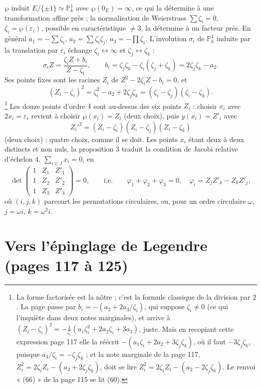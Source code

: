 \documentclass[11pt,a4paper]{article}
\begin{document}
$\wp$ induit $E/\{\pm 1\} \simeq \mathbb{P}^1_k$ avec $\wp(0_E) = \infty$, ce qui
la détermine à une transformation affine près ; la normalisation de Weierstrass
$\sum \zeta_i = 0$, $\zeta_i = \wp(\varepsilon_i)$, possible en caractéristique
$\neq 3$, la détermine à un facteur près. En général $a_1 = -\sum \zeta_i$, $a_2
= \sum \zeta_i \zeta_j$, $a_3 = -\prod \zeta_i$. L'involution $\sigma_i$ de
$\mathbb{P}^1_k$ induite par la translation par $\varepsilon_i$ échange $\zeta_i
\leftrightarrow \infty$ et $\zeta_j \leftrightarrow \zeta_k$ :
\[
\sigma_i Z = \frac{\zeta_i Z + b_i}{Z - \zeta_i}, \qquad b_i = \zeta_j\zeta_k -
\zeta_i(\zeta_j + \zeta_k) = 2\zeta_j\zeta_k - a_2 .
\]
Ses points fixes sont les racines $Z_i$ de $Z^2 - 2\zeta_i Z - b_i = 0$, et
\[
(Z_i - \zeta_i)^2 = \zeta_i^2 - a_2 + 2\zeta_j\zeta_k = (\zeta_i - \zeta_j)(\zeta_i
- \zeta_k) .
\]
\footnote{La forme factorisée est la nôtre ; c'est la formule classique de la
division par $2$. La page passe par $b_i = -(a_2 + 2a_3/\zeta_i)$, qui suppose
$\zeta_i \neq 0$ (ce qui l'inquiète dans deux notes marginales), et arrive à
$(Z_i - \zeta_i)^2 = -\frac{1}{\zeta_i}(a_1\zeta_i^2 + 2a_2\zeta_i + 3a_3)$,
juste. Mais en recopiant cette expression page 117 elle la réécrit $-(a_1\zeta_i
+ 2a_2 + 3\zeta_j\zeta_k)$, où il faut $-3\zeta_j\zeta_k$, puisque $a_3/\zeta_i =
-\zeta_j\zeta_k$ ; et la note marginale de la page 117, $Z_i^2 = 2\zeta_i Z_i -
(a_2 + 2\zeta_j\zeta_k)$, doit se lire $Z_i^2 = 2\zeta_i Z_i - (a_2 -
2\zeta_j\zeta_k)$. Le renvoi « (66) » de la page 115 se lit (60).} Les douze
points d'ordre $4$ sont au-dessus des six points $Z_i$ : choisir $x_i$ avec $2x_i
= \varepsilon_i$ revient à choisir $\wp(x_i) = Z_i$ (deux choix), puis $y(x_i) =
Z'_i$ avec
\[
Z_i'^2 = (Z_i - \zeta_i)(Z_i - \zeta_j)(Z_i - \zeta_k)
\]
(deux choix) : quatre choix, comme il se doit. Les points $x_i$ étant deux à
deux distincts et non nuls, la proposition 3 traduit la condition de Jacobi
relative d'échelon $4$, $\sum_{i \in J} x_i = 0$, en
\[
\det \begin{pmatrix} 1 & Z_1 & Z'_1 \\ 1 & Z_2 & Z'_2 \\ 1 & Z_3 & Z'_3
\end{pmatrix} = 0, \qquad \text{i.e.} \qquad \varphi_1 + \varphi_2 + \varphi_3 =
0, \quad \varphi_i = Z_j Z'_k - Z_k Z'_j,
\]
où $(i, j, k)$ parcourt les permutations circulaires, ou, pour un ordre
circulaire $\omega$, $j = \omega i$, $k = \omega^2 i$.

\section*{Vers l'épinglage de Legendre (pages 117 à 125)}
\end{document}
